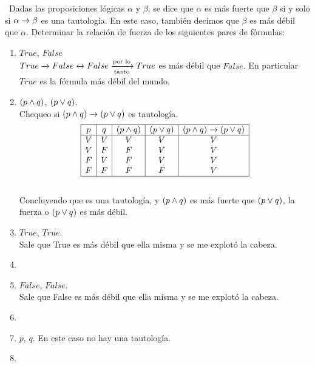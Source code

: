 \documentclass[12pt,a4paper,spanish]{article}
\begin{document}
\ejercicio\FiveStar\   Dadas las proposiciones lógicas $\alpha$ y $\beta$, se dice que $\alpha$ es más fuerte que $\beta$ si y solo si $\alpha \rightarrow \beta$ es una tautología.
En este caso, también decimos que $\beta$ es más débil que $\alpha$. Determinar la relación de fuerza de los siguientes pares de fórmulas:
\begin{enumerate}[label=\alph*)]
	\item $True$, $False$\\
	      $True \entonces False \sisolosi False \flecha{por lo}[tanto] True$ es más débil que $False$. En particular  $True$ es la fórmula más débil del mundo.

	\item $(p \land q)$, $(p \lor q)$.\\
	      Chequeo si $(p \land q) \rightarrow (p \lor q)$ es tautología.\\
	      \[
		      \begin{array}{|c|c|c|c|c|}
			      \hline
			      p & q & (p \land q ) & (p \lor q ) & (p \land q) \rightarrow (p \lor q) \\ \hline
			      V & V & V         & V         & V                           \\
			      V & F & F         & V         & V                           \\
			      F & V & F         & V         & V                           \\
			      F & F & F         & F         & V                           \\ \hline
		      \end{array}
	      \]\\
	      Concluyendo que es una tautología, y $(p \land q)$ es más fuerte que $(p \lor q)$, la fuerza o $(p \lor q)$ es más débil.
	\item $True$, $True$.\\
	      Sale que True es más débil que ella misma y se me explotó la cabeza.\\
	\item \hacer
	\item $False$, $False$.\\
	      Sale que False es más débil que ella misma y se me explotó la cabeza.\\

	\item \hacer
	\item $p$, $q$. En este caso no hay una tautología.
	\item \hacer

\end{enumerate}
\end{document}
